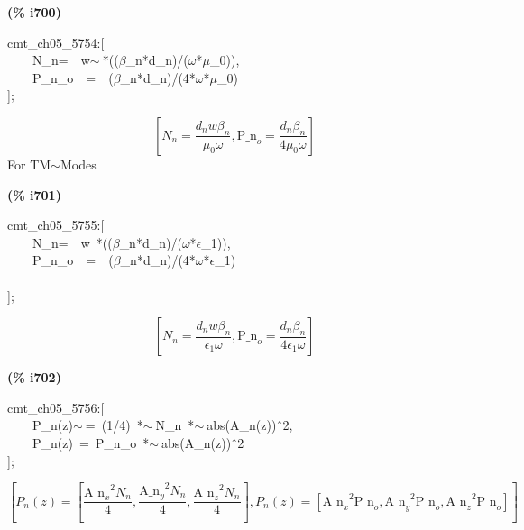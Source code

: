 \documentclass[fleqn]{article}
\begin{document}
\noindent
\begin{minipage}[t]{4.000000em}\color{red}\bfseries
(\% i700)	
\end{minipage}
\begin{minipage}[t]{\textwidth}\color{blue}
cmt\_ch05\_5754:[\\
\ \ \ \ N\_n=\ \ w\ensuremath{\sim\ }*((\ensuremath{\beta}\_n*d\_n)/(\ensuremath{\omega}*\ensuremath{\mu}\_0)),\\
\ \ \ \ P\_n\_o\ \ =\ \ (\ensuremath{\beta}\_n*d\_n)/(4*\ensuremath{\omega}*\ensuremath{\mu}\_0)\\
];
\end{minipage}
\[\displaystyle \tag{\% o700} 
\left[ {N_n}=\frac{{d_n} w {{\beta }_n}}{{{\mu }_0} \omega }\operatorname{,}{{\ensuremath{\mathrm{P\_ n}}}_o}=\frac{{d_n} {{\beta }_n}}{4 {{\mu }_0} \omega }\right] \mbox{}
\]
For TM\ensuremath{\sim }Modes


\noindent
\begin{minipage}[t]{4.000000em}\color{red}\bfseries
(\% i701)	
\end{minipage}
\begin{minipage}[t]{\textwidth}\color{blue}
cmt\_ch05\_5755:[\\
\ \ \ \ N\_n=\ \ w\ *((\ensuremath{\beta}\_n*d\_n)/(\ensuremath{\omega}*\ensuremath{\epsilon}\_1)),\\
\ \ \ \ P\_n\_o\ \ =\ \ (\ensuremath{\beta}\_n*d\_n)/(4*\ensuremath{\omega}*\ensuremath{\epsilon}\_1)\\
\\
];
\end{minipage}
\[\displaystyle \tag{\% o701} 
\left[ {N_n}=\frac{{d_n} w {{\beta }_n}}{{{\epsilon }_1} \omega }\operatorname{,}{{\ensuremath{\mathrm{P\_ n}}}_o}=\frac{{d_n} {{\beta }_n}}{4 {{\epsilon }_1} \omega }\right] \mbox{}
\]


\noindent
\begin{minipage}[t]{4.000000em}\color{red}\bfseries
(\% i702)	
\end{minipage}
\begin{minipage}[t]{\textwidth}\color{blue}
cmt\_ch05\_5756:[\\
\ \ \ \ P\_n(z)\ensuremath{\sim\ }=\ (1/4)\ *\ensuremath{\sim\ }N\_n\ *\ensuremath{\sim\ }abs(A\_n(z))\^\ 2,\\
\ \ \ \ P\_n(z)\ =\ P\_n\_o\ *\ensuremath{\sim\ }abs(A\_n(z))\^\ 2\\
];
\end{minipage}
\[\displaystyle \tag{\% o702} 
\operatorname{[}{P_n}(z)=\left[ \frac{{{{{\ensuremath{\mathrm{A\_ n}}}_x}}^{2}} {N_n}}{4}\operatorname{,}\frac{{{{{\ensuremath{\mathrm{A\_ n}}}_y}}^{2}} {N_n}}{4}\operatorname{,}\frac{{{{{\ensuremath{\mathrm{A\_ n}}}_z}}^{2}} {N_n}}{4}\right] \operatorname{,}{P_n}(z)=
\left[ {{{{\ensuremath{\mathrm{A\_ n}}}_x}}^{2}} {{\ensuremath{\mathrm{P\_ n}}}_o}\operatorname{,}{{{{\ensuremath{\mathrm{A\_ n}}}_y}}^{2}} {{\ensuremath{\mathrm{P\_ n}}}_o}\operatorname{,}{{{{\ensuremath{\mathrm{A\_ n}}}_z}}^{2}} {{\ensuremath{\mathrm{P\_ n}}}_o}\right] \operatorname{]}\mbox{}
\]
\end{document}
